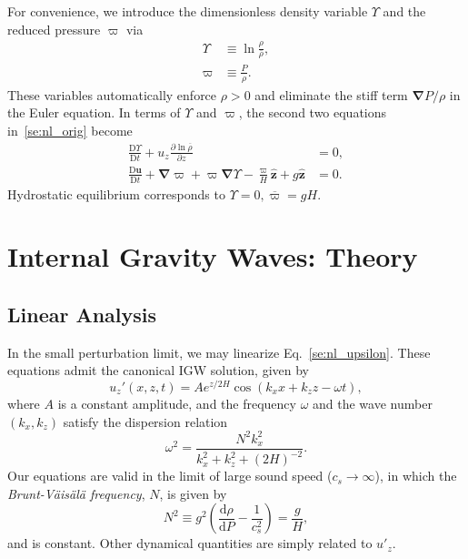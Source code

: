 \documentclass[
        fleqn,
        usenatbib,
    ]{mnras}
\newcommand*{\rd}[2]{\frac{\mathrm{d}#1}{\mathrm{d}#2}}
\newcommand*{\pd}[2]{\frac{\partial#1}{\partial#2}}
\newcommand*{\md}[2]{\frac{\mathrm{D}#1}{\mathrm{D}#2}}
\newcommand*{\p}[1]{\left(#1\right)}
\newcommand*{\bm}[1]{\mathbf{#1}}
\newcommand*{\uv}[1]{\hat{\mathbf{#1}}}
\begin{document}
For convenience, we introduce the dimensionless density variable $\Upsilon$ and
the reduced pressure $\varpi$ \citep[e.g.][]{lecoanet_anel} via
\begin{align}
    \Upsilon &\equiv \ln \frac{\rho}{\bar{\rho}},\\
    \varpi &\equiv \frac{P}{\rho}.
\end{align}
These variables automatically enforce $\rho > 0$ and eliminate the stiff term
$\bm{\nabla} P / \rho$ in the Euler equation. In terms of $\Upsilon$ and
$\varpi$, the second two equations in~\eqref{se:nl_orig} become
\begin{subequations}\label{se:nl_upsilon}
    \begin{align}
        \md{\Upsilon}{t} + u_z \pd{\ln \overline{\rho}}{z} &= 0
            ,\label{eq:nl_up_density} \\
        \md{\bm{u}}{t} + \bm{\nabla}\varpi + \varpi\bm{\nabla}\Upsilon
            - \frac{\varpi}{H}\uv{z} + g\uv{z} &= 0\label{eq:nl_upsilon_u}.
    \end{align}
\end{subequations}
Hydrostatic equilibrium corresponds to $\Upsilon = 0, \overline{\varpi} = gH$.

\section{Internal Gravity Waves: Theory}\label{s:theory}

\subsection{Linear Analysis}\label{ss:lin_analysis}

In the small perturbation limit, we may linearize Eq.~\eqref{se:nl_upsilon}.
\textcolor{Corr}{These equations admit the canonical IGW solution}, given by
\citep{drazin,sutherland0}
\begin{equation}
    u_z'\p{x, z, t} = Ae^{z/2H}\cos\p{k_{x}x + k_{z}z - \omega t},
        \label{eq:lin_sol}
\end{equation}
where $A$ is a constant amplitude, and the frequency $\omega$ and the wave
number $\p{k_x, k_z}$ satisfy the dispersion relation
\begin{equation}
    \omega^2 = \frac{N^2k_{x}^2}{k_{x}^2 + k_{z}^2 + \p{2H}^{-2}}.
        \label{eq:disp_rel}
\end{equation}
Our equations are valid in the limit of large sound speed ($c_s \to \infty$), in
which the \emph{Brunt-V\"ais\"al\"a frequency}, $N$, is given by
\begin{equation}
    N^2 \equiv g^2\p{\rd{\rho}{P} - \frac{1}{c_s^2}} = \frac{g}{H},
\end{equation}
and is constant. Other dynamical quantities are simply related to $u'_z$.
\end{document}
